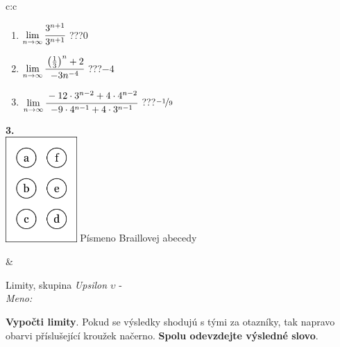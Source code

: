\documentclass[10pt]{report}
\begin{document}
\begin{tabular}{c:c}
\begin{minipage}[c][104.5mm][t]{0.5\linewidth}
\begin{center}
\begin{minipage}{0.79\linewidth}
\begin{center}
\begin{varwidth}{\linewidth}
\begin{enumerate}
\item $\lim\limits_{n\to\infty}\cfrac{3^{n+1}}{3^{n+1}}$\quad \dotfill\; ???\;\dotfill \quad $0$
\item $\lim\limits_{n\to\infty}\cfrac{\left(\frac{1}{3}\right)^n +2}{-3n^{-4}}$\quad \dotfill\; ???\;\dotfill \quad $-4$
\item $\lim\limits_{n\to\infty}\cfrac{-12\cdot 3^{n-2}+4\cdot 4^{n-2}}{-9\cdot 4^{n-1}+4\cdot 3^{n-1}}$\quad \dotfill\; ???\;\dotfill \quad $\nicefrac{-1}{9}$
\end{enumerate}
\end{varwidth}
\end{center}
\end{minipage}
\begin{minipage}{0.20\linewidth}
\begin{center}
{\Huge\bfseries 3.} \\[2mm]
\includegraphics[height=40mm]{../images/braille.png}
{\small Písmeno Braillovej abecedy}
\end{center}
\end{minipage}
\end{center}
\end{minipage}
&
\begin{minipage}[c][104.5mm][t]{0.5\linewidth}
\begin{center}
\vspace{7mm}
{\huge Limity, skupina \textit{Upsilon $\upsilon$} -}\\[5mm]
\textit{Meno:}\phantom{xxxxxxxxxxxxxxxxxxxxxxxxxxxxxxxxxxxxxxxxxxxxxxxxxxxxxxxxxxxxxxxxx}\\[5mm]
\begin{minipage}{0.95\linewidth}
\begin{center}
\textbf{Vypočti limity}. Pokud se výsledky shodujú s tými za otazníky, tak napravo\\obarvi příslušející kroužek načerno. \textbf{Spolu odevzdejte výsledné slovo}.
\end{center}
\end{minipage}
\\[1mm]
\begin{minipage}{0.79\linewidth}

\end{minipage}
\end{center}
\end{minipage}
\end{tabular}
\end{document}
